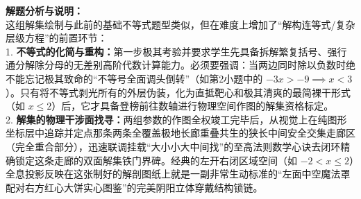 {\small\color{gray}
\textbf{解题分析与说明：}\\
这组解集绘制与此前的基础不等式题型类似，但在难度上增加了“解构连等式/复杂层级方程”的前置环节：\\
1. \textbf{不等式的化简与重构：}第一步极其考验并要求学生先具备拆解繁复括号、强行通分解除分母的无差别高阶代数计算能力。必须要强调：当两边同时除以负数时绝不能忘记极其致命的“不等号全面调头倒转”（如第2小题中的 $-3x > -9 \implies x < 3$）。只有将不等式剥光所有的外层伪装，化为直抵靶心和极其清爽的最简裸干形式（如 $x \leqslant 2$）后，它才具备登榜前往数轴进行物理空间作图的解集资格标定。\\
2. \textbf{解集的物理干涉面找寻：}两组参数的作图全权竣工完毕后，从视觉上在纯图形坐标层中追踪并定点那条两条全覆盖极地长廊重叠共生的狭长中间安全交集走廊区（完全重合部分），迅速联调挂载“大小小大中间找”的至高法则数学心诀去闭环精确锁定这条走廊的双面解集铁门界碑。经典的左开右闭区域空间（如 $-2 < x \leqslant 2$）全息投影反映在这张制好的解剖图纸上就是一副非常生动标准的“左面中空魔法罩配对右方红心大饼实心图鉴”的完美阴阳立体穿戴结构锁链。
}

\vspace{0.6cm}

